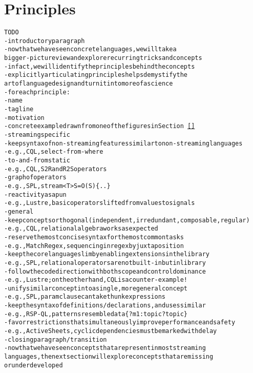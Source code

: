 \section{Principles}\label{sec:principles}

\begin{alltt}TODO\scriptsize
- introductory paragraph
  - now that we have seen concrete languages, we will take a
    bigger-picture view and explore recurring tricks and concepts
  - in fact, we will identify the principles behind the concepts
  - explicitly articulating principles helps demystify the
    art of language design and turn it into more of a science
- for each principle:
  - name
  - tagline
  - motivation
  - concrete example drawn from one of the figures in Section~\ref{}
- streaming specific
  - keep syntax of non-streaming features similar to non-streaming languages
    - e.g., CQL, select-from-where
  - to-and-from static
    - e.g., CQL, S2R and R2S operators
  - graph of operators
    - e.g., SPL, stream<T> S = O(S) \{..\}
  - reactivity as a pun
    - e.g., Lustre, basic operators lifted from values to signals
- general
  - keep concepts orthogonal (independent, irredundant, composable, regular)
    - e.g., CQL, relational algebra works as expected
  - reserve the most concise syntax for the most common tasks
    - e.g., MatchRegex, sequencing in regex by juxtaposition
  - keep the core language slim by enabling extensions in the library
    - e.g., SPL, relational operators are not built-in but in library
  - follow the code direction with both scope and control dominance
    - e.g., Lustre; on the other hand, CQL is a counter-example!
  - unify similar concept into a single, more general concept
    - e.g., SPL, param clause can take thunk expressions
  - keep the syntax of definitions/declarations, and uses similar
    - e.g., RSP-QL, patterns resemble data \{ ?m1 :topic ?topic \}
  - favor restrictions that simultaneously improve performance and safety
    - e.g., ActiveSheets, cyclic dependencies must be marked with delay
- closing paragraph / transition
  - now that we have seen concepts that are present in most streaming
    languages, the next section will explore concepts that are missing
    or underdeveloped
\end{alltt}
